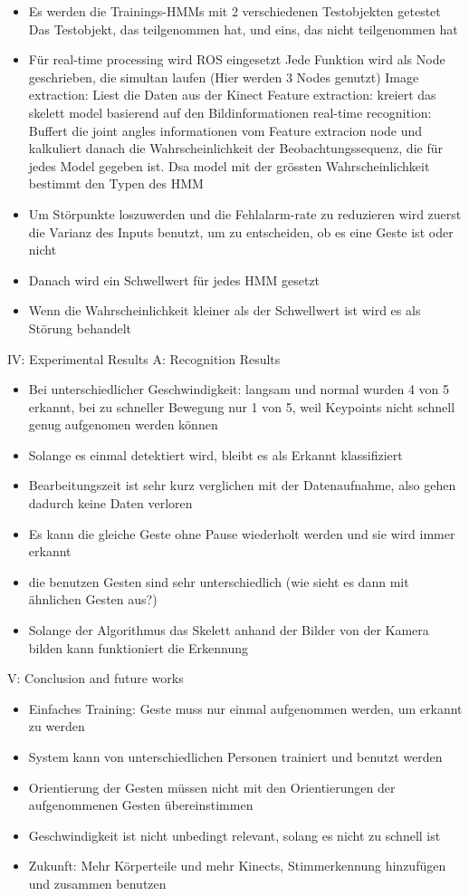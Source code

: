 \begin{itemize}
\item Es werden die Trainings-HMMs mit 2 verschiedenen Testobjekten getestet 
\subitem Das Testobjekt, das teilgenommen hat, und eins, das nicht teilgenommen hat
\item F\"ur real-time processing wird ROS eingesetzt
\subitem Jede Funktion wird als Node geschrieben, die simultan laufen (Hier werden 3 Nodes genutzt)
\subitem Image extraction: Liest die Daten aus der Kinect
\subitem Feature extraction: kreiert das skelett model basierend auf den Bildinformationen
\subitem  real-time recognition: Buffert die joint angles informationen vom Feature extracion node und kalkuliert danach die Wahrscheinlichkeit der Beobachtungssequenz, die f\"ur jedes Model gegeben ist. Dsa model mit der gr\"ossten Wahrscheinlichkeit bestimmt den Typen des HMM
\item Um St\"orpunkte loszuwerden und die Fehlalarm-rate zu reduzieren wird zuerst die Varianz des Inputs benutzt, um zu entscheiden, ob es eine Geste ist oder nicht
\item Danach wird ein Schwellwert für jedes HMM gesetzt
\item Wenn die Wahrscheinlichkeit kleiner als der Schwellwert ist wird es als St\"orung behandelt
\end{itemize}
IV: Experimental Results
A: Recognition Results
\begin{itemize}
\item Bei unterschiedlicher Geschwindigkeit: langsam und normal wurden 4 von 5 erkannt, bei zu schneller Bewegung nur 1 von 5, weil Keypoints nicht schnell genug aufgenomen werden k\"onnen
\item Solange es einmal detektiert wird, bleibt es als Erkannt klassifiziert
\item Bearbeitungszeit ist sehr kurz verglichen mit der Datenaufnahme, also gehen dadurch keine Daten verloren
\item Es kann die gleiche Geste ohne Pause wiederholt werden und sie wird immer erkannt
\item die benutzen Gesten sind sehr unterschiedlich (wie sieht es dann mit \"ahnlichen Gesten aus?)
\item Solange der Algorithmus das Skelett anhand der Bilder von der Kamera bilden kann funktioniert die Erkennung
\end{itemize}
V: Conclusion and future works
\begin{itemize}
\item Einfaches Training: Geste muss nur einmal aufgenommen werden, um erkannt zu werden
\item System kann von unterschiedlichen Personen trainiert und benutzt werden
\item Orientierung der Gesten m\"ussen nicht mit den  Orientierungen der aufgenommenen Gesten  \"ubereinstimmen
\item Geschwindigkeit ist nicht unbedingt relevant, solang es nicht zu schnell ist 
\item Zukunft: Mehr K\"orperteile und mehr Kinects, Stimmerkennung hinzuf\"ugen und zusammen benutzen
\end{itemize}
